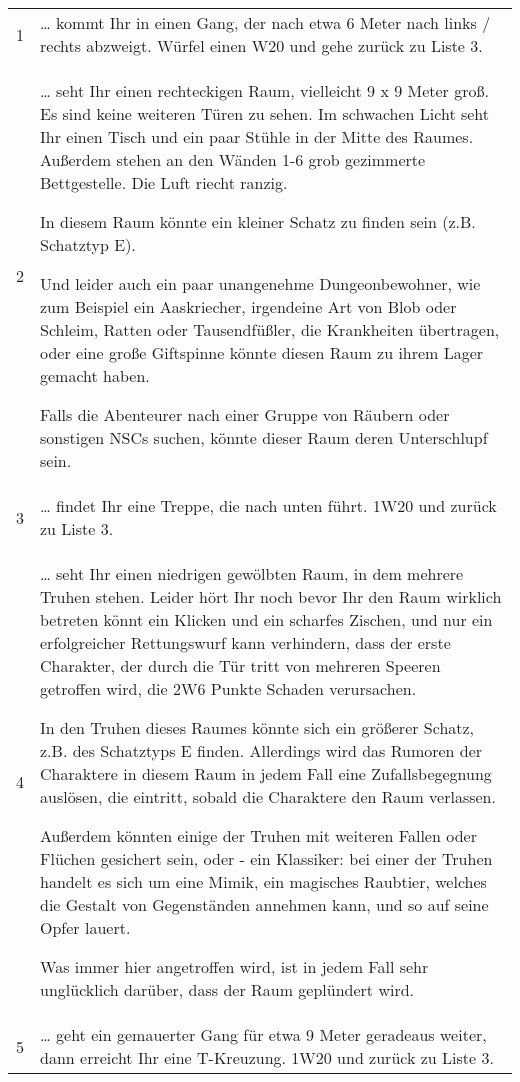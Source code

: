 \documentclass[11pt]{wbzine}
\begin{document}
\begin{tabularx}{\columnwidth}{cZ}
1 & 
  \ldots{} kommt Ihr in einen Gang, der nach etwa 6 Meter nach links /
  rechts abzweigt. Würfel einen W20 und gehe zurück zu Liste 3.
\\
2 & 
  \ldots{} seht Ihr einen rechteckigen Raum, vielleicht 9 x 9 Meter
  groß. Es sind keine weiteren Türen zu sehen. Im schwachen Licht seht
  Ihr einen Tisch und ein paar Stühle in der Mitte des Raumes. Außerdem
  stehen an den Wänden 1-6 grob gezimmerte Bettgestelle. Die Luft riecht
  ranzig.

  In diesem Raum könnte ein kleiner Schatz zu finden sein (z.B.
  Schatztyp E).

  Und leider auch ein paar unangenehme Dungeonbewohner, wie zum Beispiel
  ein Aaskriecher, irgendeine Art von Blob oder Schleim, Ratten oder
  Tausendfüßler, die Krankheiten übertragen, oder eine große Giftspinne
  könnte diesen Raum zu ihrem Lager gemacht haben.

  Falls die Abenteurer nach einer Gruppe von Räubern oder sonstigen NSCs
  suchen, könnte dieser Raum deren Unterschlupf sein.
\\
3 & 
  \ldots{} findet Ihr eine Treppe, die nach unten führt. 1W20 und zurück
  zu Liste 3.
\\
4 & 
  \ldots{} seht Ihr einen niedrigen gewölbten Raum, in dem mehrere
  Truhen stehen. Leider hört Ihr noch bevor Ihr den Raum wirklich
  betreten könnt ein Klicken und ein scharfes Zischen, und nur ein
  erfolgreicher Rettungswurf kann verhindern, dass der erste Charakter,
  der durch die Tür tritt von mehreren Speeren getroffen wird, die 2W6
  Punkte Schaden verursachen.

  In den Truhen dieses Raumes könnte sich ein größerer Schatz, z.B. des
  Schatztyps E finden. Allerdings wird das Rumoren der Charaktere in
  diesem Raum in jedem Fall eine Zufallsbegegnung auslösen, die
  eintritt, sobald die Charaktere den Raum verlassen.

  Außerdem könnten einige der Truhen mit weiteren Fallen oder Flüchen
  gesichert sein, oder - ein Klassiker: bei einer der Truhen handelt es
  sich um eine Mimik, ein magisches Raubtier, welches die Gestalt von
  Gegenständen annehmen kann, und so auf seine Opfer lauert.

  Was immer hier angetroffen wird, ist in jedem Fall sehr unglücklich
  darüber, dass der Raum geplündert wird.
\\
5 & 
  \ldots{} geht ein gemauerter Gang für etwa 9 Meter geradeaus weiter,
  dann erreicht Ihr eine T-Kreuzung. 1W20 und zurück zu Liste 3.
\\
\end{tabularx}
\end{document}
